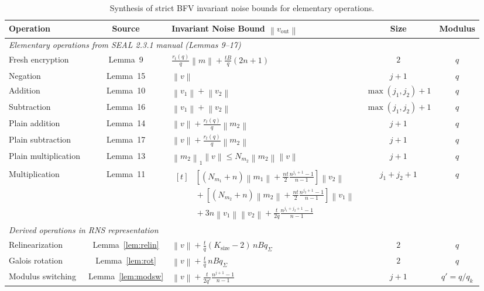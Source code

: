 \documentclass[11pt]{article}
\theoremstyle{definition}
\theoremstyle{remark}
\newcommand{\norm}[1]{\left\lVert #1\right\rVert}
\newcommand{\Sgeo}[1]{\frac{n^{#1+1}-1}{n-1}}
\begin{document}
\begin{table}[ht]
\centering
\footnotesize
\setlength{\tabcolsep}{4.5pt}
\renewcommand{\arraystretch}{1.25}
\begin{tabular}{|l|c|p{6.6cm}|c|c|}
\hline
\textbf{Operation} & \textbf{Source} & \textbf{Invariant Noise Bound $\norm{v_{\mathrm{out}}}$} & \textbf{Size} & \textbf{Modulus} \\
\hline
\hline
\multicolumn{5}{|l|}{\textit{Elementary operations from SEAL 2.3.1 manual (Lemmas 9--17)}} \\
\hline
Fresh encryption & Lemma~9 & $\frac{r_t(q)}{q}\norm{m} + \frac{tB}{q}(2n+1)$ & $2$ & $q$ \\
\hline
Negation & Lemma~15 & $\norm{v}$ & $j+1$ & $q$ \\
\hline
Addition & Lemma~10 & $\norm{v_1} + \norm{v_2}$ & $\max(j_1, j_2)+1$ & $q$ \\
\hline
Subtraction & Lemma~16 & $\norm{v_1} + \norm{v_2}$ & $\max(j_1, j_2)+1$ & $q$ \\
\hline
Plain addition & Lemma~14 & $\norm{v} + \frac{r_t(q)}{q}\norm{m_2}$ & $j+1$ & $q$ \\
\hline
Plain subtraction & Lemma~17 & $\norm{v} + \frac{r_t(q)}{q}\norm{m_2}$ & $j+1$ & $q$ \\
\hline
Plain multiplication & Lemma~13 & $\norm{m_2}_1 \norm{v} \leq N_{m_2}\norm{m_2}\norm{v}$ & $j+1$ & $q$ \\
\hline
Multiplication & Lemma~11 & 
$\begin{aligned}[t]
&\left[(N_{m_1}+n)\norm{m_1} + \frac{nt}{2}\Sgeo{j_1}\right]\norm{v_2}\\
&{}+ \left[(N_{m_2}+n)\norm{m_2} + \frac{nt}{2}\Sgeo{j_2}\right]\norm{v_1}\\
&{}+ 3n\norm{v_1}\norm{v_2} + \frac{t}{2q}\Sgeo{j_1+j_2}
\end{aligned}$ & $j_1+j_2+1$ & $q$ \\
\hline
\hline
\multicolumn{5}{|l|}{\textit{Derived operations in RNS representation}} \\
\hline
Relinearization & Lemma~\ref{lem:relin} & $\norm{v} + \frac{t}{q}(K_{\mathrm{size}}-2)\,nBq_\Sigma$ & $2$ & $q$ \\
\hline
Galois rotation & Lemma~\ref{lem:rot} & $\norm{v} + \frac{t}{q}\,nBq_\Sigma$ & $2$ & $q$ \\
\hline
Modulus switching & Lemma~\ref{lem:modsw} & $\norm{v} + \frac{t}{2q'}\Sgeo{j}$ & $j+1$ & $q' = q/q_k$ \\
\hline
\end{tabular}
\caption{Synthesis of strict BFV invariant noise bounds for elementary operations.}
\label{tab:synthesis}
\end{table}
\end{document}
